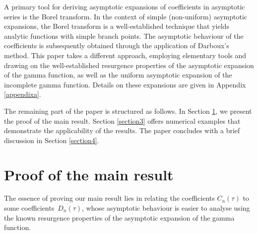 \documentclass[11pt]{article}
\numberwithin{equation}{section}
\numberwithin{equation}{section}
\begin{document}
A primary tool for deriving asymptotic expansions of coefficients in asymptotic series is the Borel transform. In the context of simple (non-uniform) asymptotic expansions, the Borel transform is a well-established technique that yields analytic functions with simple branch points. The asymptotic behaviour of the coefficients is subsequently obtained through the application of Darboux's method. This paper takes a different approach, employing elementary tools and drawing on the well-established resurgence properties of the asymptotic expansion of the gamma function, as well as the uniform asymptotic expansion of the incomplete gamma function. Details on these expansions are given in Appendix \ref{appendixa}.

The remaining part of the paper is structured as follows. In Section \ref{section2}, we present the proof of the main result. Section \ref{section3} offers numerical examples that demonstrate the applicability of the results. The paper concludes with a brief discussion in Section \ref{section4}.

\section{Proof of the main result}\label{section2}

The essence of proving our main result lies in relating the coefficients $C_n(\tau)$ to some coefficients~$D_n(\tau)$, whose asymptotic behaviour is easier to analyse using the known resurgence properties of the asymptotic expansion of the gamma function.
\end{document}
